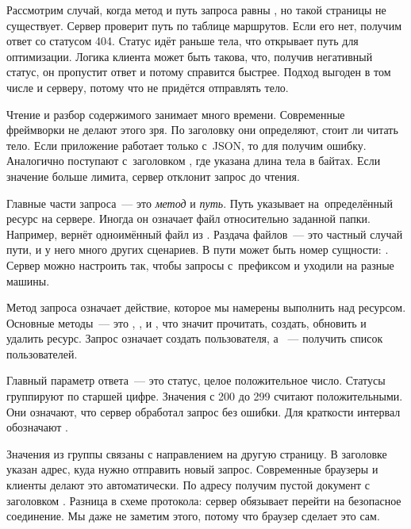 
Рассмотрим случай, когда метод и путь запроса равны , но такой
страницы не существует. Сервер проверит путь по таблице маршрутов. Если его нет,
получим ответ со статусом 404. Статус идёт раньше тела, что открывает путь для
оптимизации. Логика клиента может быть такова, что, получив негативный статус,
он пропустит ответ и потому справится быстрее. Подход выгоден в том числе и
серверу, потому что не придётся отправлять тело.

Чтение и разбор содержимого занимает много времени. Современные фреймворки не
делают этого зря. По заголовку  они определяют, стоит ли
читать тело. Если приложение работает только с~JSON, то для 
получим ошибку. Аналогично поступают с~заголовком , где
указана длина тела в байтах. Если значение больше лимита, сервер отклонит запрос
до чтения.

Главные части запроса~--- это \emph{метод} и \emph{путь}. Путь указывает
на~определённый ресурс на сервере. Иногда он означает файл относительно заданной
папки. Например,  вернёт одноимённый файл из
. Раздача файлов~--- это частный случай пути, и у него много других
сценариев. В пути может быть номер сущности: . Сервер
можно настроить так, чтобы запросы с~префиксом  и 
уходили на разные машины.


Метод запроса означает действие, которое мы намерены выполнить над
ресурсом. Основные методы~--- это , ,  и
, что значит прочитать, создать, обновить и удалить ресурс. Запрос
 означает создать пользователя, а ~---
получить список пользователей.

Главный параметр ответа~--- это статус, целое положительное число. Статусы
группируют по старшей цифре. Значения с 200 до 299 считают положительными. Они
означают, что сервер обработал запрос без ошибки. Для краткости интервал
обозначают .

Значения из группы  связаны с направлением на другую страницу. В
заголовке  указан адрес, куда нужно отправить новый
запрос. Современные браузеры и клиенты делают это автоматически. По адресу
 получим пустой документ с заголовком
. Разница в схеме протокола: сервер обязывает
перейти на безопасное соединение. Мы даже не заметим этого, потому что браузер
сделает это сам.

